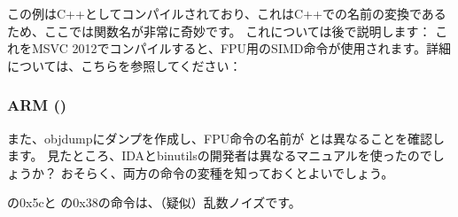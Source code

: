 

この例はC++としてコンパイルされており、これはC++での名前の変換であるため、ここでは関数名が非常に奇妙です。
これについては後で説明します：
これをMSVC 2012でコンパイルすると、FPU用のSIMD命令が使用されます。詳細については、こちらを参照してください：

\iffalse
A BUG HERE
\subsubsection{MIPS}



いくつかの奇妙な理由のために追加された無駄な\INS{LUI}命令もあります。 
このアーティファクトを以前検討しました：\myref{MIPS_FPU_LUI}
\fi

\subsubsection{ARM (\ARMMode)}




また、objdumpにダンプを作成し、FPU命令の名前が \IDA とは異なることを確認します。 
見たところ、IDAとbinutilsの開発者は異なるマニュアルを使ったのでしょうか？ 
おそらく、両方の命令の変種を知っておくとよいでしょう。



の0x5cと \main の0x38の命令は、（疑似）乱数ノイズです。
